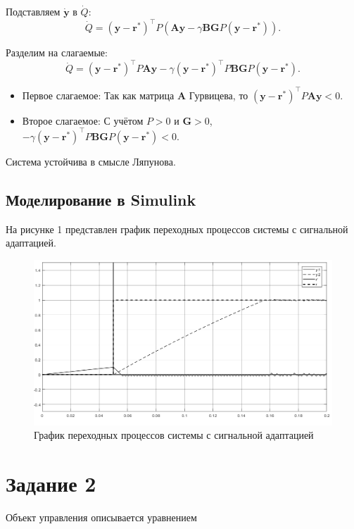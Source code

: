 \documentclass[a4paper,12pt]{extarticle} %
\begin{document}
Подставляем \( \dot{\mathbf{y}} \) в \( \dot{Q} \):
\[
\dot{Q} = (\mathbf{y} - \mathbf{r}^*)^\top P \left( \mathbf{A} \mathbf{y} - \gamma \mathbf{B} \mathbf{G} P (\mathbf{y} - \mathbf{r}^*) \right).
\]

Разделим на слагаемые:
\[
\dot{Q} = (\mathbf{y} - \mathbf{r}^*)^\top P \mathbf{A} \mathbf{y} - \gamma (\mathbf{y} - \mathbf{r}^*)^\top P \mathbf{B} \mathbf{G} P (\mathbf{y} - \mathbf{r}^*).
\]


\begin{itemize}
    \item Первое слагаемое: Так как матрица \( \mathbf{A} \) Гурвицева, то \( (\mathbf{y} - \mathbf{r}^*)^\top P \mathbf{A} \mathbf{y} < 0 \).
    \item Второе слагаемое: С учётом \( P > 0 \) и \( \mathbf{G} > 0 \), \( -\gamma (\mathbf{y} - \mathbf{r}^*)^\top P \mathbf{B} \mathbf{G} P (\mathbf{y} - \mathbf{r}^*) < 0 \).
\end{itemize}


Система устойчива в смысле Ляпунова.

\subsection*{Моделирование в Simulink}
На рисунке 1 представлен график переходных процессов системы с сигнальной адаптацией.
\begin{figure}[h]
    \centering
    \includegraphics[width=0.9\linewidth]{1.png}
    \caption{График переходных процессов системы с сигнальной адаптацией}
    \label{fig:1}
\end{figure}

\newpage
\section{Задание 2}

Объект управления описывается уравнением 
\end{document}

